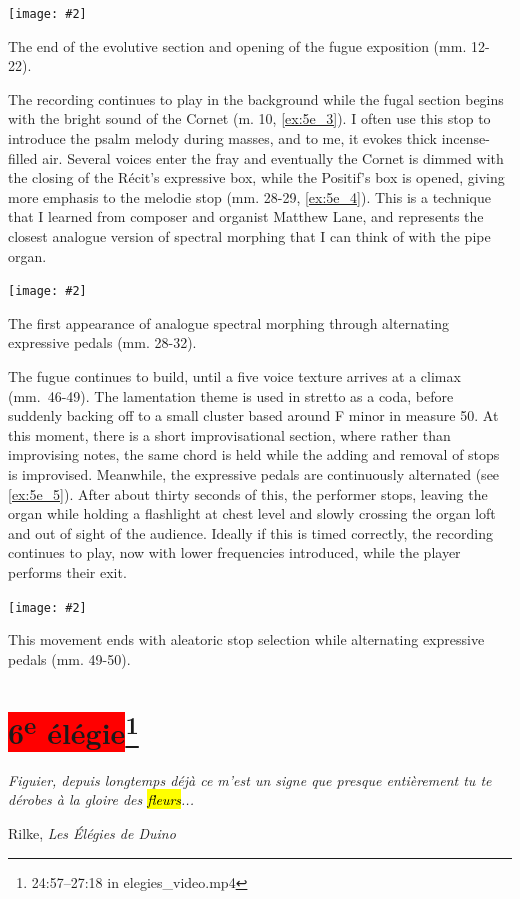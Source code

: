 \documentclass[12pt,twoside,maitrise]{dms_ks}
\newcommand{\customincludeexamples}[4][]{%
    \begin{example}[H]
        \centering
        \texttt{[image: \#2]}
        \caption{#4}
	\label{#3} 
    \end{example}
}
\theoremstyle{definition}
\begin{document}
{\customincludeexamples[width=\textwidth]{5e_3}{ex:5e_3}{The end of the evolutive section and opening of the fugue exposition (mm. 12-22).}

The recording continues to play in the background while the fugal section begins with the bright sound of the Cornet (m. 10, \cref{ex:5e_3}). 
I often use this stop to introduce the psalm melody during masses, and to me, it evokes thick incense-filled air. 
Several voices enter the fray and eventually the Cornet is dimmed with the closing of the Récit's expressive box, while the Positif's box is opened, giving more emphasis to the melodie stop (mm. 28-29, \cref{ex:5e_4}). 
This is a technique that I learned from composer and organist Matthew Lane, and represents the closest analogue version of spectral morphing that I can think of with the pipe organ. 
\customincludeexamples[width=\textwidth]{5e_4}{ex:5e_4}{The first appearance of analogue spectral morphing through alternating expressive pedals (mm. 28-32).}

The fugue continues to build, until a five voice texture arrives at a climax (mm.~46-49). The lamentation theme is used in stretto as a coda, before suddenly backing off to a small cluster based around F minor in measure 50.
At this moment, there is a short improvisational section, where rather than improvising notes, the same chord is held while the adding and removal of stops is improvised.
Meanwhile, the expressive pedals are continuously alternated (see \cref{ex:5e_5}). After about thirty seconds of this, the performer stops, leaving the organ while holding a flashlight at chest level and slowly crossing the organ loft and out of sight of the audience. Ideally if this is timed correctly, the recording continues to play, now with lower frequencies introduced, while the player performs their exit.

\customincludeexamples[width=\textwidth]{5e_5}{ex:5e_5}{This movement ends with aleatoric stop selection while alternating expressive pedals (mm. 49-50).}

\section{\colorbox{red}{6\textsuperscript{e} élégie}\footnote{24:57--27:18 in elegies\_video.mp4}}

\epigraph{\textit{Figuier, depuis longtemps déjà ce m'est un signe que presque entièrement tu te dérobes à la gloire des \hl{fleurs}...}}{Rilke, \textit{Les Élégies de Duino}\protect\footnotemark}

}
\end{document}
